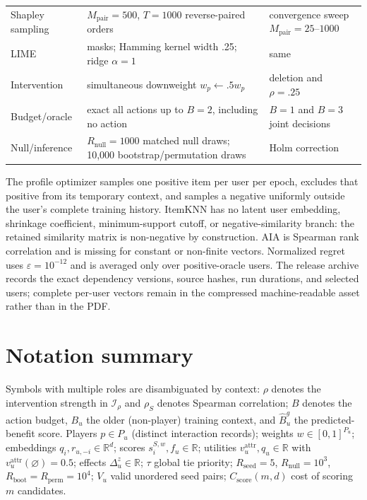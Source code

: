 \documentclass[a4paper,fleqn,doubleblind]{cas-sc}
\begin{document}
\begin{table}[!htbp]
\begin{tabular}{@{}>{\raggedright\arraybackslash}p{}>{\raggedright\arraybackslash}p{}>{\raggedright\arraybackslash}p{}@{}}
Shapley sampling & $M_{\mathrm{pair}}=500$, $T=1000$ reverse-paired orders & convergence sweep $M_{\mathrm{pair}}=25$--$1000$\\
LIME & 512 masks; Hamming kernel width .25; ridge $\alpha=1$ & same\\
Intervention & simultaneous downweight $w_p\leftarrow.5w_p$ & deletion and $\rho=.25$\\
Budget/oracle & exact all actions up to $B=2$, including no action & $B=1$ and $B=3$ joint decisions\\
Null/inference & $R_{\mathrm{null}}=1000$ matched null draws; 10,000 bootstrap/permutation draws & Holm correction\\
\bottomrule
\end{tabular}
\end{table}

The profile optimizer samples one positive item per user per epoch, excludes that positive from its temporary context, and samples a negative uniformly outside the user's complete training history. ItemKNN has no latent user embedding, shrinkage coefficient, minimum-support cutoff, or negative-similarity branch: the retained similarity matrix is non-negative by construction. AIA is Spearman rank correlation and is missing for constant or non-finite vectors. Normalized regret uses $\varepsilon=10^{-12}$ and is averaged only over positive-oracle users. The release archive records the exact dependency versions, source hashes, run durations, and selected users; complete per-user vectors remain in the compressed machine-readable asset rather than in the PDF.


\FloatBarrier
\clearpage
\section{Notation summary}\label{app:notation}
Symbols with multiple roles are disambiguated by context: $\rho$ denotes the intervention strength in $\mathcal I_\rho$ and $\rho_S$ denotes Spearman correlation; $B$ denotes the action budget, $B_u$ the older (non-player) training context, and $\widehat B_u^g$ the predicted-benefit score. Players $p\in P_u$ (distinct interaction records); weights $w\in[0,1]^{P_u}$; embeddings $q_i,r_{u,-i}\in\mathbb R^d$; scores $s_i^{S,w},f_u\in\mathbb R$; utilities $v_u^{\mathrm{attr}},q_u\in\mathbb R$ with $v_u^{\mathrm{attr}}(\varnothing)=0.5$; effects $\Delta_u^z\in\mathbb R$; $\tau$ global tie priority; $R_{\mathrm{seed}}=5$, $R_{\mathrm{null}}=10^3$, $R_{\mathrm{boot}}=R_{\mathrm{perm}}=10^4$; $V_u$ valid unordered seed pairs; $C_{\mathrm{score}}(m,d)$ cost of scoring $m$ candidates.
\end{document}
